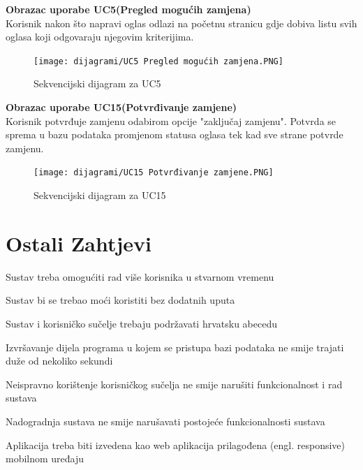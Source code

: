 \noindent \textbf{Obrazac uporabe UC5(Pregled mogućih zamjena)}\\
\indent Korisnik nakon što napravi oglas odlazi na početnu stranicu gdje dobiva listu svih oglasa koji odgovaraju njegovim kriterijima.


\begin{figure}[H]
	\texttt{[image: dijagrami/UC5 Pregled mogućih zamjena.PNG]} %
	\centering
	\caption{Sekvencijski dijagram za UC5}
	\label{fig:sekdijag3}
\end{figure}

\noindent \textbf{Obrazac uporabe UC15(Potvrđivanje zamjene)}\\
\indent Korisnik potvrđuje zamjenu odabirom opcije "zaključaj zamjenu". Potvrda se sprema u bazu podataka promjenom statusa oglasa tek kad sve strane potvrde zamjenu.


\begin{figure}[H]
	\texttt{[image: dijagrami/UC15 Potvrđivanje zamjene.PNG]} %
	\centering
	\caption{Sekvencijski dijagram za UC15}
	\label{fig:sekdijag4}
\end{figure}

\section{Ostali Zahtjevi}
\begin{packed_enum}
	\item Sustav treba omogućiti rad više korisnika u stvarnom vremenu
	\item Sustav bi se trebao moći koristiti bez dodatnih uputa
	\item Sustav i korisničko sučelje trebaju podržavati hrvatsku abecedu
	\item Izvršavanje dijela programa u kojem se pristupa bazi podataka ne smije trajati duže od nekoliko sekundi
	\item Neispravno korištenje korisničkog sučelja ne smije narušiti funkcionalnost i rad sustava
	\item Nadogradnja sustava ne smije narušavati postojeće funkcionalnosti sustava
	\item Aplikacija treba biti izvedena kao web aplikacija prilagođena (engl. responsive) mobilnom uređaju
\end{packed_enum}



